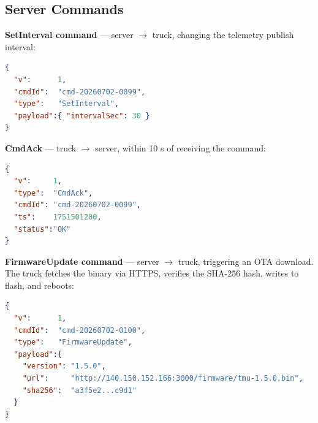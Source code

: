 \documentclass{article}
\begin{document}
\subsection{Server Commands}

\textbf{SetInterval command} --- server $\to$ truck, changing the telemetry
publish interval:

\begin{lstlisting}[language=json, caption=Topic: trucks/truck-bkk-007/cmd | QoS 1]
{
  "v":      1,
  "cmdId":  "cmd-20260702-0099",
  "type":   "SetInterval",
  "payload":{ "intervalSec": 30 }
}
\end{lstlisting}

\textbf{CmdAck} --- truck $\to$ server, within 10 s of receiving the command:

\begin{lstlisting}[language=json, caption=Topic: trucks/truck-bkk-007/event | QoS 1]
{
  "v":     1,
  "type":  "CmdAck",
  "cmdId": "cmd-20260702-0099",
  "ts":    1751501200,
  "status":"OK"
}
\end{lstlisting}

\textbf{FirmwareUpdate command} --- server $\to$ truck, triggering an OTA
download. The truck fetches the binary via HTTPS, verifies the SHA-256 hash,
writes to flash, and reboots:

\begin{lstlisting}[language=json, caption=Topic: trucks/truck-bkk-007/cmd | QoS 1]
{
  "v":      1,
  "cmdId":  "cmd-20260702-0100",
  "type":   "FirmwareUpdate",
  "payload":{
    "version": "1.5.0",
    "url":     "http://140.150.152.166:3000/firmware/tmu-1.5.0.bin",
    "sha256":  "a3f5e2...c9d1"
  }
}
\end{lstlisting}
\end{document}
